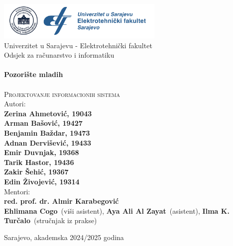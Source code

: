 \begin{titlepage}
\begin{center}

\includegraphics[width=0.6\textwidth]{Slike/etflogo.png}~\\[0.1cm]
\footnotesize Univerzitet u Sarajevu - Elektrotehnički fakultet\\[0.2cm] 
\footnotesize Odsjek za računarstvo i informatiku\\[2cm]\HRule \\[0.5cm] 
{\huge \bfseries Pozorište mladih} \\[0.4cm] 
\HRule \\[0.5cm]

\textsc{\footnotesize Projektovanje informacionih sistema}\\[0.4cm]
 
\Large Autori:\\  
\textbf{\small Zerina Ahmetović, 19043\\}
\textbf{\small Arman Bašović, 19427\\}
\textbf{\small Benjamin Baždar, 19473\\}
\textbf{\small Adnan Dervišević, 19433\\}
\textbf{\small Emir Duvnjak, 19368\\}
\textbf{\small Tarik Hastor, 19436\\}
\textbf{\small Zakir Šehić, 19367\\}
\textbf{\small Edin Živojević, 19314\\[1cm]}
\normalsize Mentori: \\[0.2cm] 
\textbf{\footnotesize red. prof. dr. Almir Karabegović} \\
\textbf{\footnotesize Ehlimana Cogo}\footnotesize ~(viši asistent), \textbf{\footnotesize Aya Ali Al Zayat}\footnotesize ~(asistent), \textbf{\footnotesize Ilma K. Turčalo}\footnotesize ~(stručnjak iz prakse)
\vfill

{\footnotesize Sarajevo, akademska 2024/2025 godina}

\end{center} 
\end{titlepage}